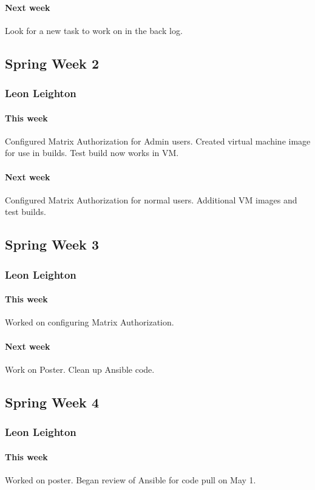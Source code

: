 \documentclass[10pt,letterpaper,onecolumn,draftclsnofoot]{IEEEtran}
\begin{document}
\paragraph{Next week}Look for a new task to work on in the back log.

\subsection{Spring Week 2}
\subsubsection{Leon Leighton}
\paragraph{This week}Configured Matrix Authorization for Admin users.    
Created virtual machine image for use in builds. Test build now works in VM.
\paragraph{Next week}Configured Matrix Authorization for normal users.  
Additional VM images and test builds.

\subsection{Spring Week 3}
\subsubsection{Leon Leighton}
\paragraph{This week} Worked on configuring Matrix Authorization. 
\paragraph{Next week} Work on Poster. Clean up Ansible code.

\subsection{Spring Week 4}
\subsubsection{Leon Leighton}
\paragraph{This week}Worked on poster.  
Began review of Ansible for code pull on May 1.
\end{document}
